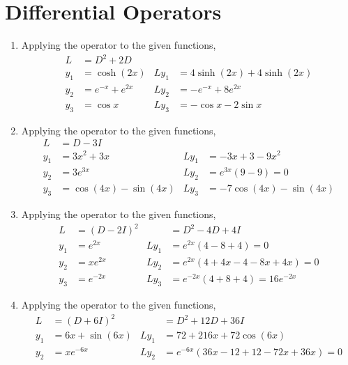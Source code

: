 \section{Differential Operators}

\begin{enumerate}
    \item Applying the operator to the given functions,
          \begin{align}
              L     & = D^{2} + 2D                                          \\
              y_{1} & = \cosh(2x)       & Ly_{1} & = 4\sinh(2x)+ 4\sinh(2x) \\
              y_{2} & = e^{-x} + e^{2x} & Ly_{2} & = -e^{-x} + 8e^{2x}      \\
              y_{3} & = \cos x          & Ly_{3} & = -\cos x - 2\sin x
          \end{align}

    \item Applying the operator to the given functions,
          \begin{align}
              L     & = D - 3I                                                       \\
              y_{1} & = 3x^{2} + 3x           & Ly_{1} & = -3x + 3 - 9x^{2}          \\
              y_{2} & = 3e^{3x}               & Ly_{2} & = e^{3x}(9 - 9) = 0         \\
              y_{3} & = \cos (4x) - \sin (4x) & Ly_{3} & = -7 \cos (4x)  - \sin (4x)
          \end{align}

    \item Applying the operator to the given functions,
          \begin{align}
              L     & = (D - 2I)^{2} &        & = D^{2} - 4D + 4I                  \\
              y_{1} & = e^{2x}       & Ly_{1} & = e^{2x} (4 - 8 + 4) = 0           \\
              y_{2} & = xe^{2x}      & Ly_{2} & = e^{2x}(4 + 4x - 4 - 8x + 4x) = 0 \\
              y_{3} & = e^{-2x}      & Ly_{3} & = e^{-2x}(4 + 8 + 4) = 16e^{-2x}
          \end{align}

    \item Applying the operator to the given functions,
          \begin{align}
              L      & = (D + 6I)^{2}                           &
                     & = D^{2} + 12D + 36I                        \\
              y_{1}  & = 6x + \sin(6x)                          &
              Ly_{1} & = 72 + 216x + 72\cos(6x)                   \\
              y_{2}  & = xe^{-6x}                               &
              Ly_{2} & = e^{-6x}(36x - 12 + 12 - 72x + 36x) = 0
          \end{align}


\end{enumerate}
